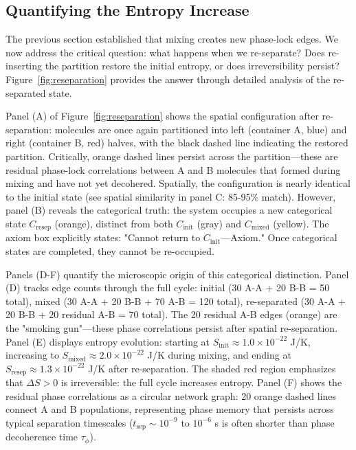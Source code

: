 \subsection{Quantifying the Entropy Increase}

The previous section established that mixing creates new phase-lock edges. We now address the critical question: what happens when we re-separate? Does re-inserting the partition restore the initial entropy, or does irreversibility persist? Figure~\ref{fig:reseparation} provides the answer through detailed analysis of the re-separated state.

Panel (A) of Figure~\ref{fig:reseparation} shows the spatial configuration after re-separation: molecules are once again partitioned into left (container A, blue) and right (container B, red) halves, with the black dashed line indicating the restored partition. Critically, orange dashed lines persist across the partition—these are residual phase-lock correlations between A and B molecules that formed during mixing and have not yet decohered. Spatially, the configuration is nearly identical to the initial state (see spatial similarity in panel C: 85-95\% match). However, panel (B) reveals the categorical truth: the system occupies a new categorical state $C_{\text{resep}}$ (orange), distinct from both $C_{\text{init}}$ (gray) and $C_{\text{mixed}}$ (yellow). The axiom box explicitly states: "Cannot return to $C_{\text{init}}$—Axiom." Once categorical states are completed, they cannot be re-occupied.

Panels (D-F) quantify the microscopic origin of this categorical distinction. Panel (D) tracks edge counts through the full cycle: initial (30 A-A + 20 B-B = 50 total), mixed (30 A-A + 20 B-B + 70 A-B = 120 total), re-separated (30 A-A + 20 B-B + 20 residual A-B = 70 total). The 20 residual A-B edges (orange) are the "smoking gun"—these phase correlations persist after spatial re-separation. Panel (E) displays entropy evolution: starting at $S_{\text{init}} \approx 1.0 \times 10^{-22}$ J/K, increasing to $S_{\text{mixed}} \approx 2.0 \times 10^{-22}$ J/K during mixing, and ending at $S_{\text{resep}} \approx 1.3 \times 10^{-22}$ J/K after re-separation. The shaded red region emphasizes that $\Delta S > 0$ is irreversible: the full cycle increases entropy. Panel (F) shows the residual phase correlations as a circular network graph: 20 orange dashed lines connect A and B populations, representing phase memory that persists across typical separation timescales ($t_{\text{sep}} \sim 10^{-9}$ to $10^{-6}$ s is often shorter than phase decoherence time $\tau_{\phi}$).


